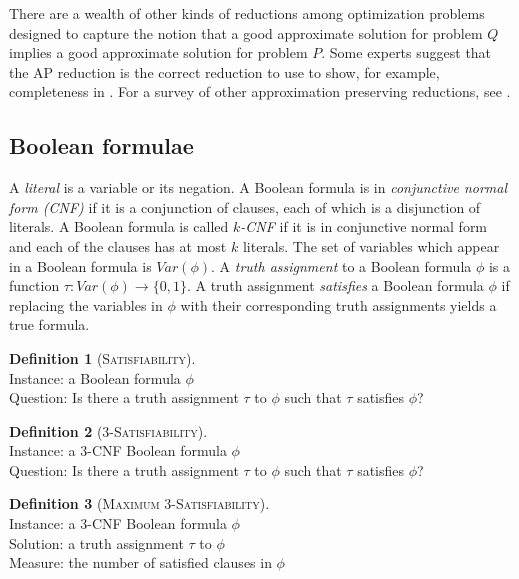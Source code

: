 \documentclass[]{article}
\theoremstyle{plain}
\theoremstyle{definition}
\newtheorem{definition}{Definition}
\newenvironment{instance}{\\Instance:}{}
\newenvironment{measure}{\\Measure:}{}
\newenvironment{solution}{\\Solution:}{}
\newenvironment{question}{\\Question:}{}
\begin{document}
There are a wealth of other kinds of reductions among optimization problems designed to capture the notion that a good approximate solution for problem $Q$ implies a good approximate solution for problem $P$.
Some experts suggest that the AP reduction is the correct reduction to use to show, for example, completeness in \APX.
For a survey of other approximation preserving reductions, see \cite{crescenzi97}.

\subsection{Boolean formulae}

A \emph{literal} is a variable or its negation.
A Boolean formula is in \emph{conjunctive normal form (CNF)} if it is a conjunction of clauses, each of which is a disjunction of literals.
A Boolean formula is called \emph{$k$-CNF} if it is in conjunctive normal form and each of the clauses has at most $k$ literals.
The set of variables which appear in a Boolean formula is $Var(\phi)$.
A \emph{truth assignment} to a Boolean formula $\phi$ is a function $\tau \colon Var(\phi) \to \{0, 1\}$.
A truth assignment \emph{satisfies} a Boolean formula $\phi$ if replacing the variables in $\phi$ with their corresponding truth assignments yields a true formula.

\begin{definition}[\textsc{Satisfiability}]
  \mbox{}
  \begin{instance}
    a Boolean formula $\phi$
  \end{instance}
  \begin{question}
    Is there a truth assignment $\tau$ to $\phi$ such that $\tau$ satisfies $\phi$?
  \end{question}
\end{definition}

\begin{definition}[\textsc{3-Satisfiability}]
  \mbox{}
  \begin{instance}
    a 3-CNF Boolean formula $\phi$
  \end{instance}
  \begin{question}
    Is there a truth assignment $\tau$ to $\phi$ such that $\tau$ satisfies $\phi$?
  \end{question}
\end{definition}

\begin{definition}[\textsc{Maximum 3-Satisfiability}]
  \mbox{}
  \begin{instance}
    a 3-CNF Boolean formula $\phi$
  \end{instance}
  \begin{solution}
    a truth assignment $\tau$ to $\phi$
  \end{solution}
  \begin{measure}
    the number of satisfied clauses in $\phi$
  \end{measure}
\end{definition}
\end{document}

